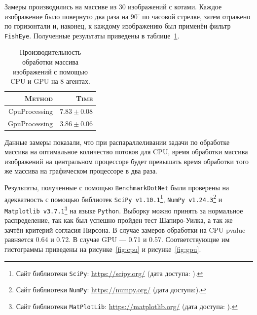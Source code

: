 Замеры производились на массиве из 30 изображений с котами. Каждое изображение было повернуто два раза на $90^{\circ}$ по часовой стрелке, затем отражено по горизонтали и, наконец, к каждому изображению был применён фильтр \texttt{FishEye}. Полученные результаты приведены в таблице~\ref{processing}.

\begin{table}[h]
\centering
    \caption{Производительность обработки массива изображений с помощью CPU и GPU на 8 агентах.}
    \begin{tabular}{| r | r |}
    \hline
        \textsc{Method} & \textsc{Time} \\ 
        \hline
        CpuProcessing & $7.83 \pm 0.08$ \\ 
        GpuProcessing & $3.86 \pm 0.06$ \\
    \hline    
    \end{tabular}%
    \label{processing}
\end{table}

Данные замеры показали, что при распараллеливании задачи по обработке массива на оптимальное количество потоков для CPU, время обработки массива изображений на центральном процессоре будет превышать время обработки того же массива на графическом процессоре в два раза.

Результаты, полученные с помощью \texttt{BenchmarkDotNet} были проверены на адекватность с помощью библиотек \texttt{SciPy v1.10.1}\footnote{Сайт библиотеки \texttt{SciPy}: \url{https://scipy.org/} (дата доступа:   ).}, \texttt{NumPy v1.24.3}\footnote{Сайт библиотеки \texttt{NumPy}: \url{https://numpy.org/} (дата доступа:).} и \texttt{Matplotlib v3.7.1}\footnote{Сайт библиотеки \texttt{MatPlotLib}: \url{https://matplotlib.org/} (дата доступа:   ).} на языке \texttt{Python}. Выборку можно принять за нормальное распределение, так как был успешно пройден тест Шапиро-Уилка, а так же зачтён критерий согласия Пирсона. В случае замеров обработки на CPU pvalue равняется 0.64 и 0.72. В случае GPU --- 0.71 и 0.57. Соответствующие им гистограммы приведены на рисунке~\ref{fig:cpu} и рисунке~\ref{fig:gpu}.

